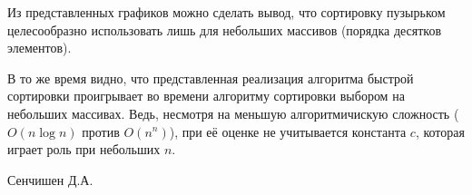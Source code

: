 \documentclass[
	12pt,
	paper=A4,
	oneside,
	draft
]{scrreprt}
\begin{document}
Из представленных графиков можно сделать вывод, что сортировку пузырьком целесообразно использовать лишь для небольших массивов (порядка десятков элементов). 

В то же время видно, что представленная реализация алгоритма быстрой сортировки проигрывает во времени алгоритму сортировки выбором на небольших массивах. Ведь, несмотря на меньшую алгоритмичискую сложность ($O(n\log n)$ против $O(n^n)$), при её оценке не учитывается константа $c$, которая играет роль при небольших $n$.
\vfill
\begin{flushright}
Сенчишен Д.А.
\end{flushright}
\end{document}
